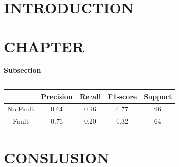 \documentclass[11pt, oneside]{book}
\begin{document}

\clearpage
\newpage
\tableofcontents
{}
\clearpage
\listoffigures
{}
\clearpage
\listoftables
{}

\mainmatter

\chapter{INTRODUCTION}

    \lipsum

\chapter{CHAPTER}

    \lipsum

    \subsubsection{Subsection}
    
        \begin{table}[h]
            \centering
            \begin{tabular}{|c|c|c|c|c|}
                \hline
                & Precision & Recall & F1-score & Support\\
                \hline
                No Fault &  0.64 & 0.96 & 0.77 & 96\\
                \hline
                Fault & 0.76 & 0.20 & 0.32 & 64\\
                \hline
            \end{tabular}
            \caption{\lipsum[1]}
        \end{table}
    
\chapter{CONSLUSION}

    \lipsum[1-7]

\backmatter
\end{document}
